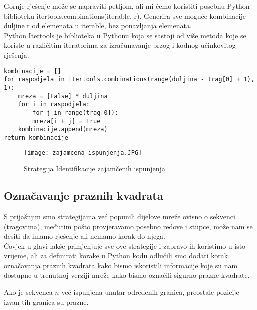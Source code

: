 \documentclass[a4paper,12pt]{article}
\begin{document}
Gornje rješenje može se napraviti petljom, ali mi ćemo koristiti posebnu Python biblioteku itertools.combinations(iterable, r). Generira sve moguće kombinacije duljine r od elemenata u iterable, bez ponavljanja elemenata.
\\
Python Itertools je biblioteka u Pythonu koja se sastoji od više metoda koje se koriste u različitim iteratorima za izračunavanje brzog i kodnog učinkovitog rješenja.


\begin{lstlisting}
kombinacije = []
for raspodjela in itertools.combinations(range(duljina - trag[0] + 1), 1):
    mreza = [False] * duljina
    for i in raspodjela:
        for j in range(trag[0]):
        mreza[i + j] = True
    kombinacije.append(mreza)
return kombinacije
\end{lstlisting}

\begin{figure}[h]
\centering
\texttt{[image: zajamcena ispunjenja.JPG]}
\caption{Strategija Identifikacije zajamčenih ispunjenja}
\end{figure}
\clearpage
\subsection{Označavanje praznih kvadrata} 
S prijašnjim smo strategijama već popunili dijelove mreže ovisno o sekvenci (tragovima), međutim pošto provjeravamo posebno redove i stupce, može nam se desiti da imamo rješenje ali nemamo korak do njega.\\
Čovjek u glavi lakše primjenjuje sve ove strategije i zapravo ih koristimo u isto vrijeme, ali za definirati korake u Python kodu odlučili smo dodati korak označavanja praznih kvadrata kako bismo iskoristili informacije koje su nam dostupne u trenutnoj verziji mreže kako bismo označili sigurno prazne kvadrate.

Ako je sekvenca $n$ već ispunjena unutar određenih granica, preostale pozicije izvan tih granica su prazne. 
\\
\end{document}
